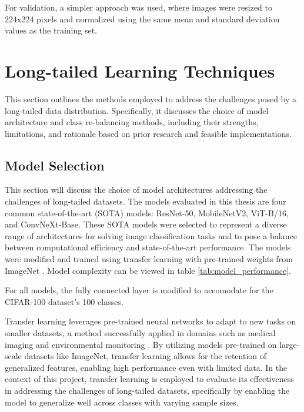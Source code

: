 For validation, a simpler approach was used, where images were resized to 224x224 pixels and normalized using the same mean and standard deviation values as the training set.

\section{Long-tailed Learning Techniques}
This section outlines the methods employed to address the challenges posed by a long-tailed data distribution. Specifically, it discusses the choice of model architecture and class re-balancing methods, including their strengths, limitations, and rationale based on prior research and feasible implementations.  

\subsection{Model Selection}
\label{sec:model_selection}


This section will discuss the choice of model architectures addressing the challenges of long-tailed datasets. The models evaluated in this thesis are four common state-of-the-art (SOTA) models: ResNet-50, MobileNetV2, ViT-B/16, and ConvNeXt-Base. These SOTA models were selected to represent a diverse range of architectures for solving image classification tasks and to pose a balance between computational efficiency and state-of-the-art performance. The models were modified and trained using transfer learning with pre-trained weights from ImageNet \cite{ILSVRC15}. Model complexity can be viewed in table \ref{tab:model_performance}.

For all models, the fully connected layer is modified to accomodate for the CIFAR-100 dataset's 100 classes.

Transfer learning leverages pre-trained neural networks to adapt to new tasks on smaller datasets, a method successfully applied in domains such as medical imaging and environmental monitoring \cite{pan2010,Hinton2006,Fu2021}. By utilizing models pre-trained on large-scale datasets like ImageNet, transfer learning allows for the retention of generalized features, enabling high performance even with limited data. In the context of this project, transfer learning is employed to evaluate its effectiveness in addressing the challenges of long-tailed datasets, specifically by enabling the model to generalize well across classes with varying sample sizes.

